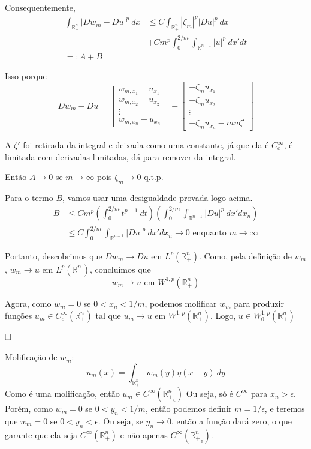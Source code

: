 \documentclass[11pt]{article}
\newcommand{\qed}{$\hfill\square$}
\newcommand{\R}{\mathbb{R}}
\newcommand{\e}{\epsilon}
\begin{document}
Consequentemente, \begin{align*}
	 \int_{\R^n_+} |Dw_m - Du|^p\ dx &\leq C \int_{\R^n_+} |\zeta_m|^p |Du|^p \ dx  \\
	  & +C m^p \int_0^{2/m} \int_{\R^{n-1}} |u|^p \ dx'dt \\
	 =: A + B
\end{align*}

Isso porque \[ Dw_m - Du = \begin{bmatrix}
	w_{m, x_1} - u_{x_1} \\
		w_{m, x_2} - u_{x_2} \\
	\vdots \\
	w_{m, x_n} - u_{x_n}
\end{bmatrix}  - \begin{bmatrix}
- \zeta_m u_{x_1} \\
-\zeta_m u_{x_2} \\
\vdots \\
-\zeta_m u_{x_n} - mu\zeta'
\end{bmatrix}\] 

A $ \zeta' $ foi retirada da integral e deixada como uma constante, já que ela é $C^\infty_c$, é limitada com derivadas limitadas, dá para remover da integral.


Então $A\rightarrow 0$ se $m\rightarrow \infty$ pois $\zeta_m \rightarrow 0$ q.t.p.

Para o termo $B$, vamos usar uma desigualdade provada logo acima. \begin{align*}
	B &\leq C m^p \left(\int_0^{2/m} t^{p-1}\ dt\right)\left(\int_0^{2/m} \int_{\R^{n-1}} |Du|^p \ dx' dx_n\right) \\
	&\leq C \int_0^{2/m} \int_{\R^{n-1}} |Du|^p \ dx'dx_n \rightarrow 0 \text{ enquanto } m \rightarrow \infty
\end{align*}

Portanto, descobrimos que $ Dw_m \rightarrow Du \text{ em } L^{p}(\R^n_+)$. Como, pela definição de $w_m$, $w_m\rightarrow u$ em $ L^p(\R^n_+)$, concluímos que \[ w_m \rightarrow u \text{ em } W^{1,p}(\R^n_+) \]

Agora, como $ w_m=0 $ se $ 0 < x_n < 1/m $, podemos molificar $ w_m $ para produzir funções $ u_m \in C^\infty_c(\R^n_+) $ tal que $ u_m \rightarrow u \text{ em } W^{1,p}(\R^n_+)$. Logo, $ u \in W^{1,p}_0 (\R^n_+) $

\qed

Molificação de $w_m$: \[ u_m(x) = \int_{\R^n_+} w_m(y) \eta(x-y)\ dy \] Como é uma molificação, então $u_m \in C^\infty({\R^n_+}_\e)$ Ou seja, só é $C^\infty$ para $x_n> \e$. Porém, como $w_m=0$ se $0 < y_n < 1/m$, então podemos definir $m=1/\e$, e teremos que $w_m=0$ se $0 < y_n < \e$. Ou seja, se $y_n \rightarrow 0$, então a função dará zero, o que garante que ela seja $C^\infty({\R^n_+})$ e não apenas $C^\infty({\R^n_+}_\e)$.
\end{document}
